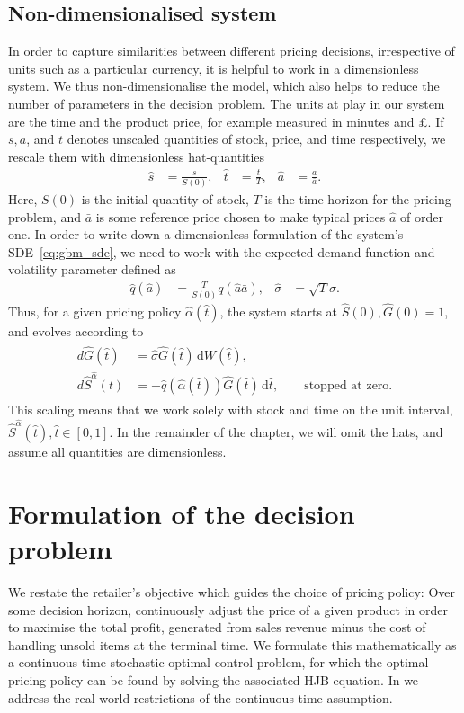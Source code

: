\documentclass[main.tex]{subfiles}
\begin{document}
\subsection{Non-dimensionalised system}\label{subsec:nondimensionalization}
In order to capture similarities between different pricing decisions, irrespective of units
such as a particular currency, it is helpful to work in a dimensionless system.
We thus non-dimensionalise the model, which also helps to reduce the
number of parameters in the decision problem.
The units at play in our system are the time and the product price,
for example measured in minutes and \pounds.
If $s,a$, and $t$ denotes unscaled quantities of stock, price, and
time respectively, we rescale them with dimensionless hat-quantities
\begin{align}
  \hat s&=\frac{s}{S(0)},&\hat t &=\frac{t}{T},
  &\hat a &= \frac{a}{\bar a}.
\end{align}
Here, $S(0)$ is the initial quantity of stock, $T$ is the time-horizon
for the pricing problem, and $\bar a$ is some reference price chosen
to make typical prices $\hat a$ of order one.
In order to write down a dimensionless formulation of the system's
SDE~\eqref{eq:gbm_sde}, we need to work with the expected demand
function and volatility parameter defined as
\begin{align}
  \hat q(\hat a)&=\frac{T}{S(0)}q(\hat a \bar a),
  &\hat \sigma &= \sqrt{T}\sigma.
\end{align}
Thus, for a given pricing policy $\hat \alpha(\hat t)$, the
system starts at $\hat S(0),\hat G(0)=1$, and evolves according to
\begin{align}
  \begin{split}\label{eq:gbm_sde_nondim}
    d\hat G(\hat t)&=\hat \sigma \hat G(\hat t)\,\mathrm{d}W(\hat t),\\
    d\hat S^{\hat \alpha}(t)&=-\hat q(\hat \alpha(\hat t))\hat G(\hat
    t)\,\mathrm{d}\hat t,\qquad\text{stopped at zero}.
  \end{split}
\end{align}
This scaling means that we work solely with stock and time on the unit interval, $\hat S^{\hat \alpha}(\hat t),\hat t\in[0,1]$.
In the remainder of the chapter, we will omit the hats, and assume all
quantities are dimensionless.

\section{Formulation of the decision
  problem}\label{sec:decision_formulation}
We restate the retailer's objective which
guides the choice of pricing policy: Over some decision horizon, continuously
adjust the price of a given product in order to maximise
the total profit, generated from sales revenue minus the cost of handling
unsold items at the terminal time. We formulate this mathematically as
a continuous-time stochastic optimal control problem, for which the optimal pricing
policy can be found by solving the associated HJB equation.
In  we address the real-world restrictions of
the continuous-time assumption.
\end{document}
